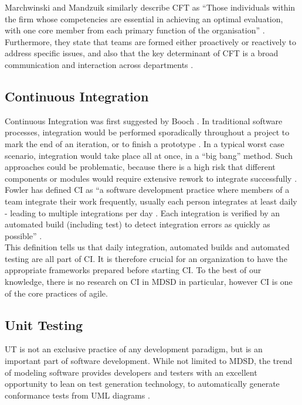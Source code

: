 \documentclass[fina_report_innit.tex]{subfiles}
\begin{document}
Marchwinski and Mandzuik similarly describe CFT as ``Those individuals within the firm whose competencies are essential in achieving an optimal evaluation, with one core member from each primary function of the organisation'' \cite{marchwinski2000technical}. Furthermore, they state that teams are formed either proactively or reactively to address specific issues, and also that the key determinant of CFT is a broad communication and interaction across departments \cite{marchwinski2000technical}.

\subsection{Continuous Integration}
Continuous Integration was first suggested by Booch \cite{booch2006object}. In traditional software processes, integration would be performed sporadically throughout a project to mark the end of an iteration, or to finish a prototype \cite{booch2006object}. In a typical worst case scenario, integration would take place all at once, in a “big bang” method. Such approaches could be problematic, because there is a high risk that different components or modules would require extensive rework to integrate successfully \cite{booch2006object}.
\\

Fowler has defined CI as “a software development practice where members of a team  integrate  their  work  frequently,  usually  each person  integrates  at  least  daily  -  leading  to  multiple integrations per day \cite{fowler2006continuous}. Each integration is verified by an automated build (including test) to detect integration errors as quickly as possible” \cite{fowler2006continuous}.
\\

This definition tells us that daily integration, automated builds and automated testing are all part of CI. It is therefore crucial for an organization to have the appropriate frameworks prepared before starting CI. To the best of our knowledge, there is no research on CI in MDSD in particular, however CI is one of the core practices of agile.

\subsection{Unit Testing}
UT is not an exclusive practice of any development paradigm, but is an important part of software development. While not limited to MDSD, the trend of modeling software provides developers and testers with an excellent opportunity to lean on test generation technology, to automatically generate conformance tests from UML diagrams \cite{mussa2009survey}\cite{hartmann2004uml}.  
\\
\end{document}
